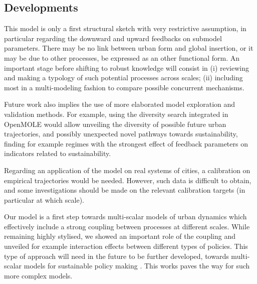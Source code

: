 \documentclass[11pt]{article}
\begin{document}
\subsection{Developments}


This model is only a first structural sketch with very restrictive assumption, in particular regarding the downward and upward feedbacks on submodel parameters. There may be no link between urban form and global insertion, or it may be due to other processes, be expressed as an other functional form. An important stage before shifting to robust knowledge will consist in (i) reviewing and making a typology of such potential processes across scales; (ii) including most in a multi-modeling fashion to compare possible concurrent mechanisms.

Future work also implies the use of more elaborated model exploration and validation methods. For example, using the diversity search integrated in OpenMOLE \cite{reuillon2013openmole} would allow unveiling the diversity of possible future urban trajectories, and possibly unexpected novel pathways towards sustainability, finding for example regimes with the strongest effect of feedback parameters on indicators related to sustainability.

Regarding an application of the model on real systems of cities, a calibration on empirical trajectories would be needed. However, such data is difficult to obtain, and some investigations should be made on the relevant calibration targets (in particular at which scale).


Our model is a first step towards multi-scalar models of urban dynamics which effectively include a strong coupling between processes at different scales. While remaining highly stylised, we showed an important role of the coupling and unveiled for example interaction effects between different types of policies. This type of approach will need in the future to be further developed, towards multi-scalar models for sustainable policy making \cite{Rozenblat2018}. This works paves the way for such more complex models.
\end{document}

